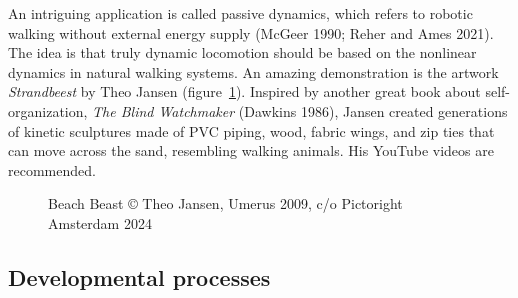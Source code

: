 \documentclass[
  a4paper,
  DIV=11,
  numbers=noendperiod,
  oneside]{scrreprt}
\begin{document}
An intriguing application is called passive dynamics, which refers to
robotic walking without external energy supply (McGeer 1990; Reher and
Ames 2021). The idea is that truly dynamic locomotion should be based on
the nonlinear dynamics in natural walking systems. An amazing
demonstration is the artwork \emph{Strandbeest} by Theo Jansen
(figure~\ref{fig-ch5n-img8-old-46}). Inspired by another great book
about self-organization, \emph{The Blind Watchmaker} (Dawkins 1986),
Jansen created generations of kinetic sculptures made of PVC piping,
wood, fabric wings, and zip ties that can move across the sand,
resembling walking animals. His YouTube videos are recommended.

\begin{figure}


\caption{\label{fig-ch5n-img8-old-46}Beach Beast © Theo Jansen, Umerus
2009, c/o Pictoright Amsterdam 2024}

\end{figure}%

\subsection{Developmental processes}\label{sec-Developmental-processes}
\end{document}
